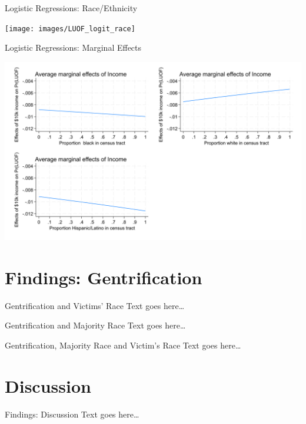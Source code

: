 \documentclass{beamer}
\begin{document}
\begin{frame}{Logistic Regressions: Race/Ethnicity}
	\begin{center}
	\texttt{[image: images/LUOF\_logit\_race]}
	\end{center}
\end{frame}

\begin{frame}{Logistic Regressions: Marginal Effects}
	\begin{center}
		\includegraphics[height=0.9\textheight]{images/LUOF_logit_combined_effects}
	\end{center}
\end{frame}

\section{Findings: Gentrification}
\begin{frame}{Gentrification and Victims’ Race}
	Text goes here\ldots
\end{frame}

\begin{frame}{Gentrification and Majority Race}
	Text goes here\ldots
\end{frame}

\begin{frame}{Gentrification, Majority Race and Victim’s Race}
	Text goes here\ldots
\end{frame}

\section{Discussion}
\begin{frame}{Findings: Discussion}
	Text goes here\ldots
\end{frame}
\end{document}
